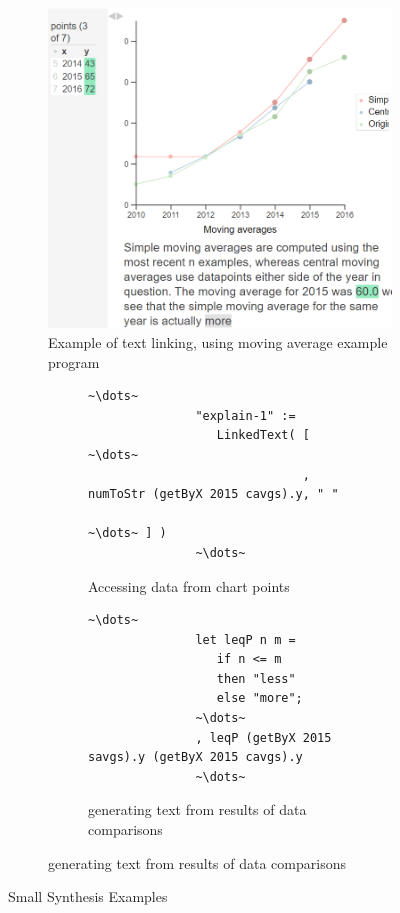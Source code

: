 \begin{figure}
      \begin{subfigure}{0.4\textwidth}
         \includegraphics[width=\textwidth]{fig/text-viz.png}
         \caption{Example of text linking, using moving average example program}
         \label{fig:mavg}
      \end{subfigure}
      \hfill
      \begin{subfigure}{0.5\textwidth}
         \begin{subfigure}{\textwidth}
            \tiny
            \begin{lstlisting}[language=Fluid]
               ~\dots~
               "explain-1" :=
                  LinkedText( [ ~\dots~
                              , numToStr (getByX 2015 cavgs).y, " "
                              ~\dots~ ] )
               ~\dots~
            \end{lstlisting}
            \caption{Accessing data from chart points}
            \label{fig:synthex-1}
         \end{subfigure}
         \vfill
         \begin{subfigure}{\textwidth}
            \tiny
            \begin{lstlisting}[language=Fluid]
               ~\dots~
               let leqP n m = 
                  if n <= m
                  then "less"
                  else "more";
               ~\dots~
               , leqP (getByX 2015 savgs).y (getByX 2015 cavgs).y
               ~\dots~
            \end{lstlisting}
            \caption{generating text from results of data comparisons}
            \label{fig:synthex-2}
         \end{subfigure}
      \end{subfigure}
   \caption{Small Synthesis Examples}
   \label{fig:synthex}
\end{figure}